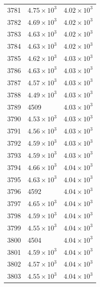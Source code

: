 \begin{table}[H]
\begin{tabular}{lll}
3781 & $\displaystyle 4.75 \times 10^{3}$ & $\displaystyle 4.02 \times 10^{3}$ \\
3782 & $\displaystyle 4.69 \times 10^{3}$ & $\displaystyle 4.02 \times 10^{3}$ \\
3783 & $\displaystyle 4.63 \times 10^{3}$ & $\displaystyle 4.02 \times 10^{3}$ \\
3784 & $\displaystyle 4.63 \times 10^{3}$ & $\displaystyle 4.02 \times 10^{3}$ \\
3785 & $\displaystyle 4.62 \times 10^{3}$ & $\displaystyle 4.03 \times 10^{3}$ \\
3786 & $\displaystyle 4.63 \times 10^{3}$ & $\displaystyle 4.03 \times 10^{3}$ \\
3787 & $\displaystyle 4.57 \times 10^{3}$ & $\displaystyle 4.03 \times 10^{3}$ \\
3788 & $\displaystyle 4.49 \times 10^{3}$ & $\displaystyle 4.03 \times 10^{3}$ \\
3789 & 4509 & $\displaystyle 4.03 \times 10^{3}$ \\
3790 & $\displaystyle 4.53 \times 10^{3}$ & $\displaystyle 4.03 \times 10^{3}$ \\
3791 & $\displaystyle 4.56 \times 10^{3}$ & $\displaystyle 4.03 \times 10^{3}$ \\
3792 & $\displaystyle 4.59 \times 10^{3}$ & $\displaystyle 4.03 \times 10^{3}$ \\
3793 & $\displaystyle 4.59 \times 10^{3}$ & $\displaystyle 4.03 \times 10^{3}$ \\
3794 & $\displaystyle 4.66 \times 10^{3}$ & $\displaystyle 4.04 \times 10^{3}$ \\
3795 & $\displaystyle 4.63 \times 10^{3}$ & $\displaystyle 4.04 \times 10^{3}$ \\
3796 & 4592 & $\displaystyle 4.04 \times 10^{3}$ \\
3797 & $\displaystyle 4.65 \times 10^{3}$ & $\displaystyle 4.04 \times 10^{3}$ \\
3798 & $\displaystyle 4.59 \times 10^{3}$ & $\displaystyle 4.04 \times 10^{3}$ \\
3799 & $\displaystyle 4.55 \times 10^{3}$ & $\displaystyle 4.04 \times 10^{3}$ \\
3800 & 4504 & $\displaystyle 4.04 \times 10^{3}$ \\
3801 & $\displaystyle 4.59 \times 10^{3}$ & $\displaystyle 4.04 \times 10^{3}$ \\
3802 & $\displaystyle 4.57 \times 10^{3}$ & $\displaystyle 4.04 \times 10^{3}$ \\
3803 & $\displaystyle 4.55 \times 10^{3}$ & $\displaystyle 4.04 \times 10^{3}$ \\

\end{tabular}
\end{table}
